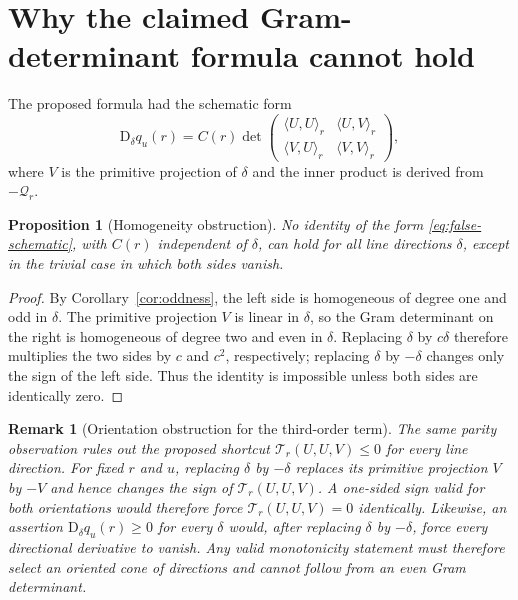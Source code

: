 \documentclass[11pt]{article}
\newtheorem{proposition}[theorem]{Proposition}
\newtheorem{remark}[theorem]{Remark}
\theoremstyle{definition}
\newcommand{\D}{\mathrm{D}}
\newcommand{\Q}{\mathcal{Q}}
\newcommand{\T}{\mathcal{T}}
\begin{document}
\section{Why the claimed Gram-determinant formula cannot hold}

The proposed formula had the schematic form
\begin{equation}\label{eq:false-schematic}
 \D_\delta q_u(r)
 =C(r)\det
 \begin{pmatrix}
  \langle U,U\rangle_r&\langle U,V\rangle_r\\
  \langle V,U\rangle_r&\langle V,V\rangle_r
 \end{pmatrix},
\end{equation}
where $V$ is the primitive projection of $\delta$ and the inner product is derived from
$-\Q_r$.

\begin{proposition}[Homogeneity obstruction]\label{prop:homogeneity-obstruction}
No identity of the form \eqref{eq:false-schematic}, with $C(r)$ independent of $\delta$,
can hold for all line directions $\delta$, except in the trivial case in which both sides vanish.
\end{proposition}

\begin{proof}
By Corollary~\ref{cor:oddness}, the left side is homogeneous of degree one and odd in $\delta$.
The primitive projection $V$ is linear in $\delta$, so the Gram determinant on the right is
homogeneous of degree two and even in $\delta$.  Replacing $\delta$ by $c\delta$ therefore
multiplies the two sides by $c$ and $c^2$, respectively; replacing $\delta$ by $-\delta$
changes only the sign of the left side.  Thus the identity is impossible unless both sides
are identically zero.
\end{proof}

\begin{remark}[Orientation obstruction for the third-order term]\label{rem:T-sign}
The same parity observation rules out the proposed shortcut
$\T_r(U,U,V)\le0$ for every line direction.  For fixed $r$ and $u$, replacing
$\delta$ by $-\delta$ replaces its primitive projection $V$ by $-V$ and hence changes the
sign of $\T_r(U,U,V)$.  A one-sided sign valid for both orientations would therefore force
$\T_r(U,U,V)=0$ identically.  Likewise, an assertion
$\D_\delta q_u(r)\ge0$ for every $\delta$ would, after replacing $\delta$ by $-\delta$,
force every directional derivative to vanish.  Any valid monotonicity statement must therefore
select an oriented cone of directions and cannot follow from an even Gram determinant.
\end{remark}
\end{document}
